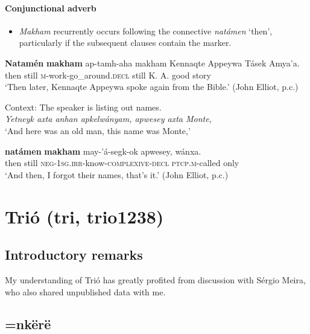 \paragraph{Conjunctional adverb}\label{appendixEnxetSurConjunctional}
\begin{itemize}
	\item \textit{Makham} recurrently occurs following the connective \textit{natámen} \lq then', particularly if the subsequent clauses contain the marker.
\end{itemize}

\begin{exe}
	\ex
	\gll \textbf{Natamén} \textbf{makham} ap-tamh-aha makham Kennaqte Appeywa Tásek Amya’a.\\
	then still \textsc{m}-work-go\_around.\textsc{decl} still K. A. good story\\
	\glt \lq Then later, Kennaqte Appeywa spoke again from the Bible.\rq{ }(John Elliot, p.c.)

	\ex
	Context: The speaker is listing out names.\\
	\textit{Yetneyk axta anhan apkelwányam, apwesey axta Monte,}
	\\ \lq And here was an old man, this name was Monte,\rq{}

	\gll \textbf{natámen} \textbf{makham} may-'á-segk-ok apwesey, wánxa.\\
	then still \textsc{neg}-1\textsc{sg}.\textsc{irr}-know-\textsc{complexive}-\textsc{decl} \textsc{ptcp}.\textsc{m}-called only\\
	\glt \lq And then, I forgot their names, that's it.' (John Elliot, p.c.)
\end{exe}

\pagebreak
\section{Trió (tri, trio1238)}
\label{appendixTrio}

\subsection{Introductory remarks}
My understanding of Trió has greatly profited from discussion with Sérgio Meira, who also shared unpublished data with me.

\subsection{=nkërë}


